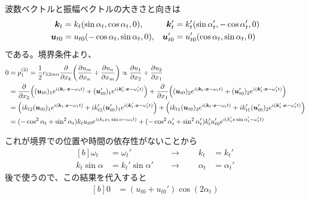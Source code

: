 \documentclass[../ap_2021.tex]{subfiles}
\begin{document}
\section{}
波数ベクトルと振幅ベクトルの大きさと向きは
\begin{equation}\begin{aligned}[b]
    \vb*{k}_t&=k_t(\sin\alpha_t,\cos\alpha_t,0),& \vb*{k}_t'&=k_t'(\sin\alpha_t',-\cos\alpha_t',0)\\
    \vb*{u}_{t0} &= u_{t0}(-\cos\alpha_t,\sin\alpha_t,0),& \vb*{u}_{t0}' &= u_{t0}'(\cos\alpha_t,\sin\alpha_t,0)
\end{aligned}\end{equation}
である。境界条件より、
\begin{equation}\begin{aligned}[b]
    0 &= p_1^{(2)}
    = \frac{1}{2}c_{12mn}\pdv{x_k}\qty(\pdv{u_m}{x_n}+\pdv{u_n}{x_m})
    \propto \pdv{u_1}{x_2}+\pdv{u_2}{x_1}\\
    &=\pdv{x_2}\qty((\vb*{u}_{t0})_1e^{i(\vb*{k}_t\cdot\vb*{x}-\omega_tt)}+(\vb*{u}_{t0}')_1e^{i(\vb*{k}_t'\cdot\vb*{x}-\omega_t't)})
    +\pdv{x_1}\qty((\vb*{u}_{t0})_2e^{i(\vb*{k}_t\cdot\vb*{x}-\omega_tt)}+(\vb*{u}_{t0}')_2e^{i(\vb*{k}_t'\cdot\vb*{x}-\omega_t't)})\\
    &=\qty(ik_{t2}(\vb*{u}_{t0})_1e^{i(\vb*{k}_t\cdot\vb*{x}-\omega_tt)}+ik_{t2}'(\vb*{u}_{t0}')_1e^{i(\vb*{k}_t'\cdot\vb*{x}-\omega_t't)})
    +\qty(ik_{t1}(\vb*{u}_{t0})_2e^{i(\vb*{k}_t\cdot\vb*{x}-\omega_tt)}+ik_{t1}'(\vb*{u}_{t0}')_2e^{i(\vb*{k}_t'\cdot\vb*{x}-\omega_t't)})\\
    &= (-\cos^2\alpha_t+\sin^2\alpha_t)k_tu_{t0}e^{i(k_tx_1\sin\alpha-\omega_tt)}
    +(-\cos^2\alpha'_t+\sin^2\alpha'_t)k_t'u_{t0}'e^{i(k_t'x\sin\alpha_t'-\omega_t't)}\\
\end{aligned}\end{equation}
これが境界での位置や時間の依存性がないことから
\begin{equation}\begin{aligned}[b]
    \omega_t&=\omega_t'\quad&\rightarrow\qquad k_t&=k_t'\\
    k_t\sin\alpha &= k_t'\sin\alpha'\quad&\rightarrow\qquad \alpha_t&=\alpha_t'
\end{aligned}\end{equation}
後で使うので、この結果を代入すると
\begin{equation}\begin{aligned}[b]
    0 &= (u_{t0}+u_{t0}')\cos(2\alpha_t)
\end{aligned}\end{equation}
\end{document}
